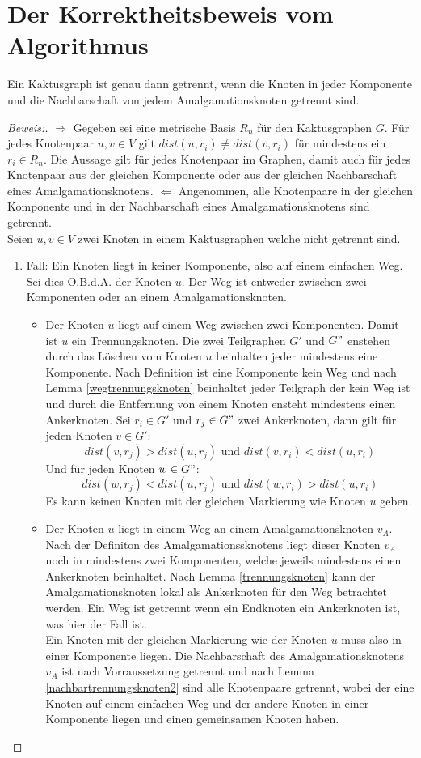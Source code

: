 \section{Der Korrektheitsbeweis vom Algorithmus}
\begin{lem}
Ein Kaktusgraph ist genau dann getrennt, wenn die Knoten in jeder Komponente und die Nachbarschaft von jedem Amalgamationsknoten getrennt sind.  
\end{lem}
\begin{proof}[Beweis:]
$\Longrightarrow$ Gegeben sei eine metrische Basis $R_n$ für den Kaktusgraphen $G$. Für jedes Knotenpaar $u,v \in V$ gilt $dist(u,r_i)\neq dist(v,r_i)$ für mindestens ein $r_i \in R_n$. Die Aussage gilt für jedes Knotenpaar im Graphen, damit auch für jedes Knotenpaar aus der gleichen Komponente oder aus der gleichen Nachbarschaft eines Amalgamationsknotens.\newline
$\Longleftarrow$ Angenommen, alle Knotenpaare in der gleichen Komponente und in der Nachbarschaft eines Amalgamationsknotens sind getrennt.\\
Seien $u,v \in V$ zwei Knoten in einem Kaktusgraphen welche nicht getrennt sind.
\begin{enumerate}
\item Fall: Ein Knoten liegt in keiner Komponente, also auf einem einfachen Weg. Sei dies O.B.d.A. der Knoten $u$. Der Weg ist entweder zwischen zwei Komponenten oder an einem Amalgamationsknoten.
\begin{itemize}
\item Der Knoten $u$ liegt auf einem Weg zwischen zwei Komponenten. Damit ist $u$ ein Trennungsknoten. Die zwei Teilgraphen $G'$ und $G"$ enstehen durch das Löschen vom Knoten $u$ beinhalten jeder mindestens eine Komponente. Nach Definition ist eine Komponente kein Weg und nach Lemma \ref{wegtrennungsknoten} beinhaltet jeder Teilgraph der kein Weg ist und durch die Entfernung von einem Knoten ensteht mindestens einen Ankerknoten. Sei $r_i \in G'$ und $r_j \in G"$ zwei Ankerknoten, dann gilt für jeden Knoten $v \in G'$:
$$ dist(v,r_j)>dist(u,r_j)\text{ und } dist(v,r_i)<dist(u,r_i)$$
Und für jeden Knoten $w \in G"$:
$$ dist(w,r_j)<dist(u,r_j)\text{ und } dist(w,r_i)>dist(u,r_i)$$
Es kann keinen Knoten mit der gleichen Markierung wie Knoten $u$ geben.
\item Der Knoten $u$ liegt in einem Weg an einem Amalgamationsknoten $v_A$. Nach der Definiton des Amalgamationssknotens liegt dieser Knoten $v_A$ noch in mindestens zwei Komponenten, welche jeweils mindestens einen Ankerknoten beinhaltet. Nach Lemma \ref{trennungsknoten} kann der Amalgamationsknoten lokal als Ankerknoten für den Weg betrachtet werden. Ein Weg ist getrennt wenn ein Endknoten ein Ankerknoten ist, was hier der Fall ist.\\Ein Knoten mit der gleichen Markierung wie der Knoten $u$ muss also in einer Komponente liegen. Die Nachbarschaft des Amalgamationsknotens $v_A$ ist nach Vorraussetzung getrennt und nach Lemma \ref{nachbartrennungsknoten2} sind alle Knotenpaare getrennt, wobei der eine Knoten auf einem einfachen Weg und der andere Knoten in einer Komponente liegen und einen gemeinsamen Knoten haben.  

\end{itemize}
\end{enumerate}
\end{proof}
